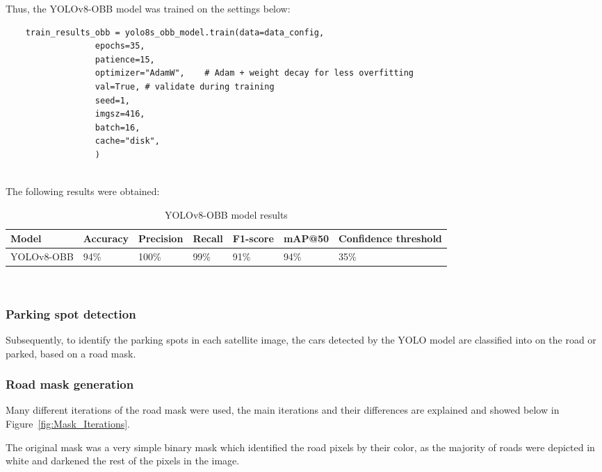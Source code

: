 Thus, the YOLOv8-OBB model was trained on the settings below:
\begin{listing}[h!]
  \centering
  \begin{verbatim}
    train_results_obb = yolo8s_obb_model.train(data=data_config,
                  epochs=35,
                  patience=15,
                  optimizer="AdamW",    # Adam + weight decay for less overfitting
                  val=True, # validate during training
                  seed=1,
                  imgsz=416,
                  batch=16,
                  cache="disk",
                  )
  \end{verbatim}
\end{listing}\\
The following results were obtained:
\begin{table}[h!]
  \centering
  \begin{tabular}{|p{}|p{}|p{}|p{}|p{}|p{}|p{}|}
    \hline
    \textbf{Model} & \textbf{Accuracy} & \textbf{Precision} & \textbf{Recall} & \textbf{F1-score} & \textbf{mAP@50} & \textbf{Confidence threshold} \\
    \hline
    YOLOv8-OBB     & 94\%              & 100\%              & 99\%            & 91\%              & 94\%            & 35\%                          \\
    \hline
  \end{tabular}
  \caption{YOLOv8-OBB model results}
\end{table}\\

\newpage
\subsubsection{Parking spot detection}
Subsequently, to identify the parking spots in each satellite image, the cars detected by the YOLO model are classified into on the road or parked, based on a road mask.

\subsubsection{Road mask generation}
Many different iterations of the road mask were used, the main iterations and their differences are explained and showed below in Figure~\ref{fig:Mask_Iterations}.

The original mask was a very simple binary mask which identified the road pixels by their color, as the majority of roads were depicted in white and darkened the rest of the pixels in the image.

